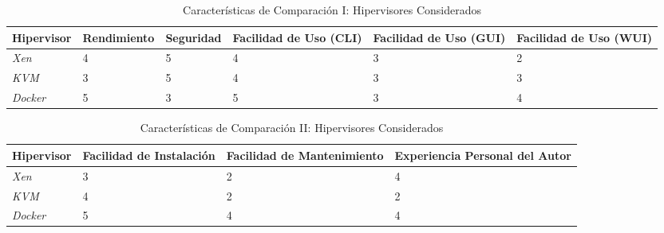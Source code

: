 \begin{table}
	\centering
	\begin{tabular}{|p{1.85cm}|p{2.25cm}|p{1.8cm}|p{1.7cm}|p{1.7cm}|p{1.7cm}|}
    	\hline
		\textbf{Hipervisor} & \textbf{Rendimiento} & \textbf{Seguridad} & \textbf{Facilidad de Uso (CLI)} & \textbf{Facilidad de Uso (GUI)} & \textbf{Facilidad de Uso (WUI)} \\
        \hline
        \textit{Xen} & 4 & 5 & 4 & 3 & 2 \\
        \hline
        \textit{KVM} & 3 & 5 & 4 & 3 & 3 \\
        \hline
        \textit{Docker} & 5 & 3 & 5 & 3 & 4 \\
        \hline
	\end{tabular}
    \caption{Características de Comparación I: Hipervisores Considerados}
    \label{tab:hipervisor-compar-i}
\end{table}

\begin{table}
	\centering
	\begin{tabular}{|p{1.85cm}|p{2.2cm}|p{3.0cm}|p{1.9cm}|}
    	\hline
		\textbf{Hipervisor} & \textbf{Facilidad de Instalación} & \textbf{Facilidad de Mantenimiento} & \textbf{Experiencia Personal del Autor} \\
        \hline
        \textit{Xen} & 3 & 2 & 4 \\
        \hline
        \textit{KVM} & 4 & 2 & 2 \\
        \hline
        \textit{Docker} & 5 & 4 & 4 \\
        \hline
	\end{tabular}
    \caption{Características de Comparación II: Hipervisores Considerados}
    \label{tab:hipervisor-compar-ii}
\end{table}

